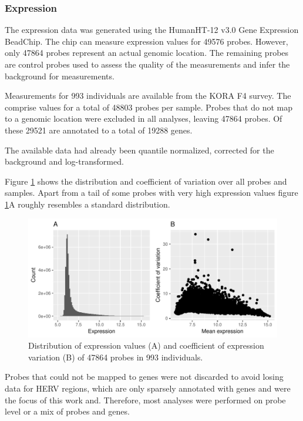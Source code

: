 \documentclass[a4paper,12pt]{article}
\begin{document}
\subsubsection{Expression}
The expression data was generated using the HumanHT-12 v3.0 Gene Expression BeadChip. The chip can measure expression values for 49576 probes. However, only 47864 probes represent an actual genomic location. The remaining probes are control probes used to assess the quality of the measurements and infer the background for measurements. 

Measurements for 993 individuals are available from the KORA F4 survey. The comprise values for a total of 48803 probes per sample. Probes that do not map to a genomic location were excluded in all analyses, leaving 47864 probes. Of these 29521 are annotated to a total of 19288 genes. 

The available data had already been quantile normalized, corrected for the background and log-transformed. 

Figure \ref{fig:expr.raw.hist.cov} shows the distribution and coefficient of variation over all probes and samples. Apart from a tail of some probes with very high expression values figure \ref{fig:expr.raw.hist.cov}A roughly resembles a standard distribution. 

\begin{figure}[tb]
	\includegraphics[scale = 1, keepaspectratio = true]{../figures/expr_raw_hist_cov}  
	\caption{Distribution of expression values (A) and coefficient of expression variation (B) of 47864 probes in 993 individuals.}
    \label{fig:expr.raw.hist.cov}
\end{figure}


Probes that could not be mapped to genes were not discarded to avoid losing data for HERV regions, which are only sparsely annotated with genes and were the focus of this work and. Therefore, most analyses were performed on probe level or a mix of probes and genes.
\end{document}
